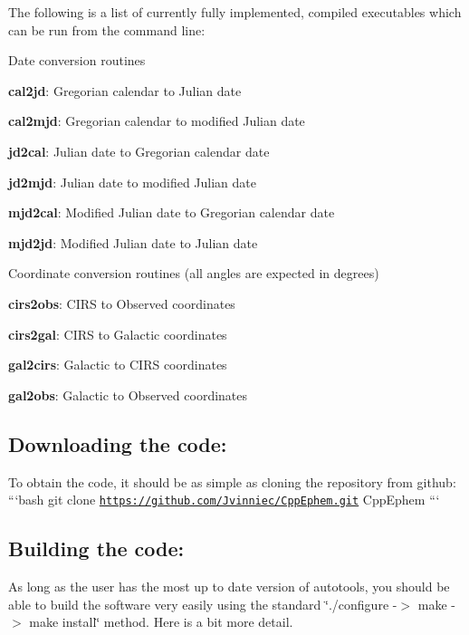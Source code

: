 The following is a list of currently fully implemented, compiled executables which can be run from the command line\+:
\begin{DoxyItemize}
\item Date conversion routines
\begin{DoxyItemize}
\item {\bfseries cal2jd}\+: Gregorian calendar to Julian date
\item {\bfseries cal2mjd}\+: Gregorian calendar to modified Julian date
\item {\bfseries jd2cal}\+: Julian date to Gregorian calendar date
\item {\bfseries jd2mjd}\+: Julian date to modified Julian date
\item {\bfseries mjd2cal}\+: Modified Julian date to Gregorian calendar date
\item {\bfseries mjd2jd}\+: Modified Julian date to Julian date
\end{DoxyItemize}
\item Coordinate conversion routines (all angles are expected in degrees)
\begin{DoxyItemize}
\item {\bfseries cirs2obs}\+: C\+I\+R\+S to Observed coordinates
\item {\bfseries cirs2gal}\+: C\+I\+R\+S to Galactic coordinates
\item {\bfseries gal2cirs}\+: Galactic to C\+I\+R\+S coordinates
\item {\bfseries gal2obs}\+: Galactic to Observed coordinates
\end{DoxyItemize}
\end{DoxyItemize}

\subsection*{Downloading the code\+: }

To obtain the code, it should be as simple as cloning the repository from github\+: ```bash git clone \href{https://github.com/Jvinniec/CppEphem.git}{\tt https\+://github.\+com/\+Jvinniec/\+Cpp\+Ephem.\+git} Cpp\+Ephem ```

\subsection*{Building the code\+: }

As long as the user has the most up to date version of autotools, you should be able to build the software very easily using the standard \char`\"{}./configure -\/$>$ make -\/$>$ make install\char`\"{} method. Here is a bit more detail.

